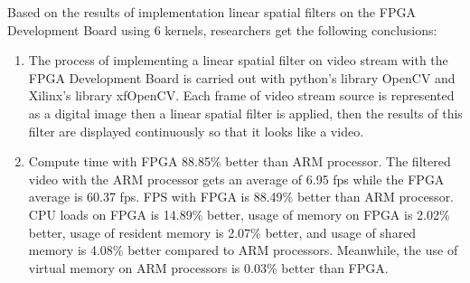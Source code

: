 Based on the results of implementation linear spatial filters on the FPGA Development Board using 6 kernels, researchers get the following conclusions:
\begin{enumerate}[topsep=0pt,itemsep=0pt,partopsep=0pt, parsep=0pt]

    \item The process of implementing a linear spatial filter on video stream with the FPGA Development Board is carried out with python's library OpenCV and Xilinx's library xfOpenCV. Each frame of video stream source is represented as a digital image then a linear spatial filter is applied, then the results of this filter are displayed continuously so that it looks like a video.


    \item Compute time with FPGA 88.85\% better than ARM processor. The filtered video with the ARM processor gets an average of 6.95 fps while the FPGA average is 60.37 fps. FPS with FPGA is 88.49\% better than ARM processor. CPU loads on FPGA is 14.89\% better, usage of memory on FPGA is 2.02\% better, usage of resident memory is 2.07\% better, and usage of shared memory is 4.08\% better compared to ARM processors. Meanwhile, the use of virtual memory on ARM processors is 0.03\% better than FPGA.
\end{enumerate}